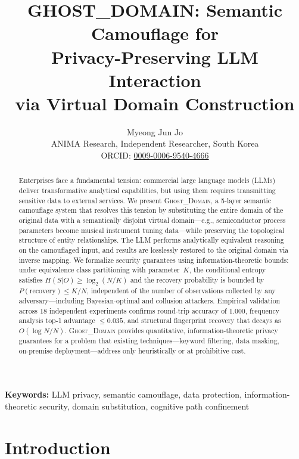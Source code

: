 \documentclass[11pt]{article}
\title{\textbf{GHOST\_DOMAIN}: Semantic Camouflage for\\Privacy-Preserving LLM Interaction\\via Virtual Domain Construction}
\author{
  Myeong Jun Jo\\
  ANIMA Research, Independent Researcher, South Korea\\
  ORCID: \href{https://orcid.org/0009-0006-9540-4666}{0009-0006-9540-4666}
}
\date{}
\begin{document}
\maketitle

\begin{abstract}
Enterprises face a fundamental tension: commercial large language models (LLMs) deliver transformative analytical capabilities, but using them requires transmitting sensitive data to external services. We present \textsc{Ghost\_Domain}, a 5-layer semantic camouflage system that resolves this tension by substituting the entire domain of the original data with a semantically disjoint virtual domain---e.g., semiconductor process parameters become musical instrument tuning data---while preserving the topological structure of entity relationships. The LLM performs analytically equivalent reasoning on the camouflaged input, and results are losslessly restored to the original domain via inverse mapping. We formalize security guarantees using information-theoretic bounds: under equivalence class partitioning with parameter~$K$, the conditional entropy satisfies $H(S|O) \geq \log_2(N/K)$ and the recovery probability is bounded by $P(\text{recovery}) \leq K/N$, independent of the number of observations collected by any adversary---including Bayesian-optimal and collusion attackers. Empirical validation across 18 independent experiments confirms round-trip accuracy of 1.000, frequency analysis top-1 advantage $\leq 0.035$, and structural fingerprint recovery that decays as $O(\log N / N)$. \textsc{Ghost\_Domain} provides quantitative, information-theoretic privacy guarantees for a problem that existing techniques---keyword filtering, data masking, on-premise deployment---address only heuristically or at prohibitive cost.
\end{abstract}

\noindent\textbf{Keywords:} LLM privacy, semantic camouflage, data protection, information-theoretic security, domain substitution, cognitive path confinement

\section{Introduction}
\end{document}
